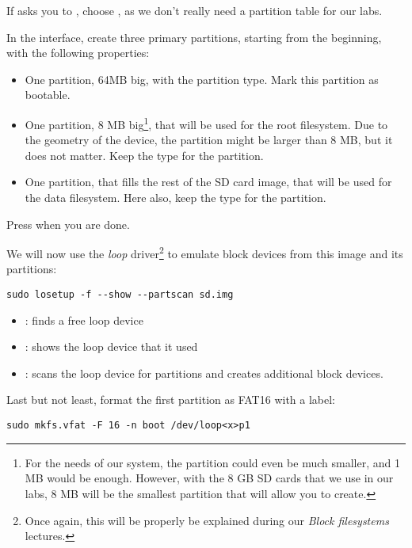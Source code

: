 If  asks you to , choose
, as we don't really need a  partition table for
our labs.

In the  interface, create three primary partitions,
starting from the beginning, with the following properties:

\begin{itemize}
\item One partition, 64MB big, with the  partition type.
      Mark this partition as bootable.

\item One partition, 8 MB big\footnote{For the needs of our system,
  the partition could even be much smaller, and 1 MB would be enough.
  However, with the 8 GB SD cards that we use in our labs, 8 MB will
  be the smallest partition that  will allow you to
  create.}, that will be used for the root filesystem. Due to the
  geometry of the device, the partition might be larger than 8 MB,
  but it does not matter. Keep the  type for the
  partition.

\item One partition, that fills the rest of the SD card image, that will be
  used for the data filesystem. Here also, keep the  type
  for the partition.
\end{itemize}

Press  when you are done.

We will now use the {\em loop} driver\footnote{Once again, this will
be properly be explained during our {\em Block filesystems} lectures.}
to emulate block devices from this image and its partitions:

\begin{verbatim}
sudo losetup -f --show --partscan sd.img
\end{verbatim}

\begin{itemize}
\item {}: finds a free loop device
\item {}: shows the loop device that it used
\item {}: scans the loop device for partitions
    and creates additional  block devices.
\end{itemize}

Last but not least, format the first partition as FAT16 with
a  label:

\begin{verbatim}
sudo mkfs.vfat -F 16 -n boot /dev/loop<x>p1
\end{verbatim}

